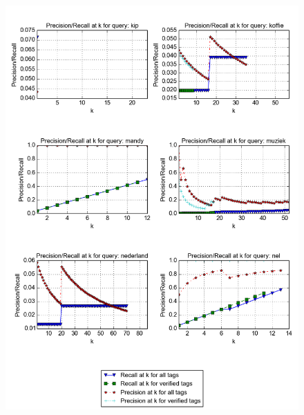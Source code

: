 \begin{figure}[H]
\centering
\includegraphics[width=\textwidth]{appendixd/queries-kip}
\end{figure}


